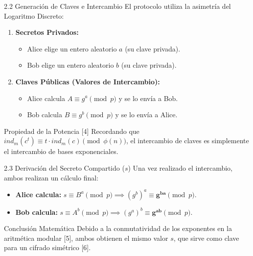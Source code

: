 \documentclass{beamer}
\begin{document}
\begin{frame}{2.2 Generación de Claves e Intercambio}
    El protocolo utiliza la asimetría del Logaritmo Discreto:
    \begin{enumerate}
        \item \textbf{Secretos Privados:}
        \begin{itemize}
            \item Alice elige un entero aleatorio \textbf{$a$} (su clave privada).
            \item Bob elige un entero aleatorio \textbf{$b$} (su clave privada).
        \end{itemize}
        \item \textbf{Claves Públicas (Valores de Intercambio):}
        \begin{itemize}
            \item Alice calcula $A \equiv g^a \pmod p$ y se lo envía a Bob.
            \item Bob calcula $B \equiv g^b \pmod p$ y se lo envía a Alice.
        \end{itemize}
    \end{enumerate}
    
    \begin{exampleblock}{Propiedad de la Potencia [4]}
        Recordando que $ind_m(c^t) \equiv t \cdot ind_m(c) \pmod{\phi(n)}$, el intercambio de claves es simplemente el intercambio de bases exponenciales.
    \end{exampleblock}
\end{frame}

\begin{frame}{2.3 Derivación del Secreto Compartido ($s$)}
    Una vez realizado el intercambio, ambos realizan un cálculo final:
    \begin{itemize}
        \item \textbf{Alice calcula:} $s \equiv B^a \pmod p \implies (g^b)^a \equiv \mathbf{g^{ba}} \pmod p$.
        \item \textbf{Bob calcula:} $s \equiv A^b \pmod p \implies (g^a)^b \equiv \mathbf{g^{ab}} \pmod p$.
    \end{itemize}
    
    \begin{block}{Conclusión Matemática}
        Debido a la conmutatividad de los exponentes en la aritmética modular [5], ambos obtienen el mismo valor $s$, que sirve como clave para un cifrado simétrico [6].
    \end{block}

    \begin{center}
    \end{center}
\end{frame}
\end{document}
